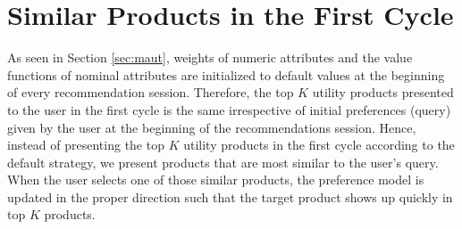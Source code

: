 \section{Similar Products in the First Cycle}
\label{sec:sim}
As seen in Section \ref{sec:maut}, weights of numeric attributes and the value functions of nominal attributes are initialized to default values at the beginning of every recommendation session.
Therefore, the top $K$ utility products presented to the user in the first cycle is the same irrespective of initial preferences (query) given by the user at the beginning of the recommendations session.
Hence, instead of presenting the top $K$ utility products in the first cycle according to the default strategy, we present products that are most similar to the user's query.
When the user selects one of those similar products, the preference model is updated in the proper direction such that the target product shows up quickly in top $K$ products.
